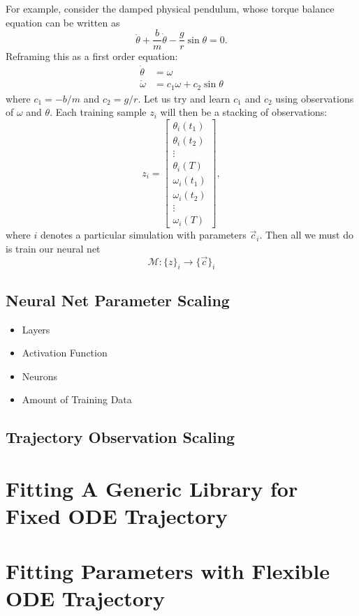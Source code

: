 \documentclass{article}
\begin{document}
For example, consider the damped physical pendulum, whose torque balance equation can be written as
\begin{equation}
    \ddot{\theta} + \frac{b}{m}\dot{\theta} - \frac{g}{r}\sin\theta = 0.
\end{equation}
Reframing this as a first order equation:
\begin{align}
    \dot{\theta} &= \omega \\
    \dot{\omega} &= c_1 \omega + c_2 \sin\theta
\end{align}
where $c_1=-b/m$ and $c_2=g/r$. Let us try and learn $c_1$ and $c_2$ using observations of $\omega$ and $\theta$. Each training sample $z_i$ will then be a stacking of observations:
\begin{equation}
    z_i = \begin{bmatrix}
        \theta_i(t_1) \\ \theta_i(t_2) \\ \vdots \\ \theta_i(T) \\
        \omega_i(t_1) \\ \omega_i(t_2) \\ \vdots \\ \omega_i(T)
    \end{bmatrix},
\end{equation}
where $i$ denotes a particular simulation with parameters $\vec{c}_i$. Then all we must do is train our neural net
\begin{equation}
    \mathcal{M}: \{z\}_i \to \{\vec{c}\}_i
\end{equation}

\subsection{Neural Net Parameter Scaling}
\begin{itemize}
    \item Layers
    \item Activation Function
    \item Neurons
    \item Amount of Training Data
\end{itemize}

\subsection{Trajectory Observation Scaling}

\section{Fitting A Generic Library for Fixed ODE Trajectory}

\section{Fitting Parameters with Flexible ODE Trajectory}
\end{document}
